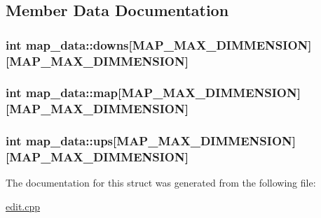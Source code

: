 \subsection{Member Data Documentation}
\hypertarget{structmap__data_a7e93f0db5466398f6f4efd84051ce303}{
\subsubsection[{downs}]{\setlength{\rightskip}{0pt plus 5cm}int map\-\_\-data\-::downs\mbox{[}{\bf M\-A\-P\-\_\-\-M\-A\-X\-\_\-\-D\-I\-M\-M\-E\-N\-S\-I\-O\-N}\mbox{]}\mbox{[}{\bf M\-A\-P\-\_\-\-M\-A\-X\-\_\-\-D\-I\-M\-M\-E\-N\-S\-I\-O\-N}\mbox{]}}}\label{structmap__data_a7e93f0db5466398f6f4efd84051ce303}
\hypertarget{structmap__data_a0170274f605ffb6e847e6e66f1c88b11}{
\subsubsection[{map}]{\setlength{\rightskip}{0pt plus 5cm}int map\-\_\-data\-::map\mbox{[}{\bf M\-A\-P\-\_\-\-M\-A\-X\-\_\-\-D\-I\-M\-M\-E\-N\-S\-I\-O\-N}\mbox{]}\mbox{[}{\bf M\-A\-P\-\_\-\-M\-A\-X\-\_\-\-D\-I\-M\-M\-E\-N\-S\-I\-O\-N}\mbox{]}}}\label{structmap__data_a0170274f605ffb6e847e6e66f1c88b11}
\hypertarget{structmap__data_a94a5e51d7057378e683988bb082a6dc2}{
\subsubsection[{ups}]{\setlength{\rightskip}{0pt plus 5cm}int map\-\_\-data\-::ups\mbox{[}{\bf M\-A\-P\-\_\-\-M\-A\-X\-\_\-\-D\-I\-M\-M\-E\-N\-S\-I\-O\-N}\mbox{]}\mbox{[}{\bf M\-A\-P\-\_\-\-M\-A\-X\-\_\-\-D\-I\-M\-M\-E\-N\-S\-I\-O\-N}\mbox{]}}}\label{structmap__data_a94a5e51d7057378e683988bb082a6dc2}


The documentation for this struct was generated from the following file\-:\begin{DoxyCompactItemize}
\item 
\hyperlink{edit_8cpp}{edit.\-cpp}\end{DoxyCompactItemize}

